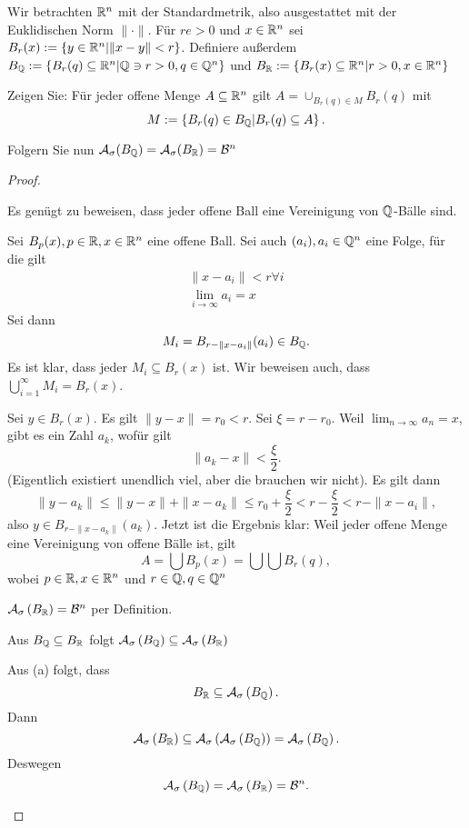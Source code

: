 \begin{Problem}
	Wir betrachten $\mathbb{R}^n$ mit der Standardmetrik, also ausgestattet mit der Euklidischen Norm $\|\cdot\|$. F\"{u}r $re>0$ und $x\in \mathbb{R}^n$ sei $B_r(x):=\left\{ y\in \mathbb{R}^n |\|x-y\|<r \right\} $. Definiere außerdem $B_{\mathbb{Q}} := \left\{ B_r(q)\subseteq \mathbb{R}^n | \mathbb{Q} \ni r > 0, q \in \mathbb{Q}^n \right\} $ und $B_{\mathbb{R}} :=\left\{ B_r(x)\subseteq \mathbb{R}^n | r > 0, x \in \mathbb{R}^n \right\} $ 
	\begin{parts}
	\item Zeigen Sie: F\"{u}r jeder offene Menge $A\subseteq \mathbb{R}^n$ gilt $A=\cup_{B_r(q)\in M}B_r(q)$ mit
		\[
		M:= \left\{ B_r(q)\in B_{\mathbb{Q}}| B_r(q)\subseteq A \right\} 
		.\]
	\item Folgern Sie nun $\mathcal A_\sigma (B_{\mathbb{Q}})=\mathcal A_\sigma(B_{\mathbb{R}})=\mathcal{B}^n$
	\end{parts}
\end{Problem}

\begin{proof}
\begin{parts}
\item Es genügt zu beweisen, dass jeder offene Ball eine Vereinigung von $\mathbb{Q}$-Bälle sind.

	Sei $B_p(x), p\in \mathbb{R}, x\in \mathbb{R}^n$ eine offene Ball. Sei auch $(a_i), a_i\in \mathbb{Q}^n$ eine Folge, für die gilt
\begin{gather*}
	\|x-a_i\|<r \forall i\\
	\lim_{i \to \infty} a_i=x
\end{gather*}
Sei dann
\[
	M_i=B_{r-\|x-a_i\|}(a_i)\in B_{\mathbb{Q}}
.\] 
Es ist klar, dass jeder $M_i\subseteq B_r(x)$ ist. Wir beweisen auch, dass $\bigcup_{i=1} ^\infty M_i=B_r(x)$.

Sei $y\in B_r(x)$. Es gilt $\|y-x\|=r_0<r$. Sei $\xi=r-r_0$. Weil $\lim_{n \to \infty} a_n=x$, gibt es ein Zahl $a_k$, wof\"{u}r gilt
\[
\|a_k-x\|<\frac{\xi}{2}
.\] 
(Eigentlich existiert unendlich viel, aber die brauchen wir nicht). Es gilt dann
\[
\|y-a_k\|\le \|y-x\|+\|x-a_k\|\le r_0+\frac{\xi}{2}<r-\frac{\xi}{2}<r-\|x-a_i\|
,\] 
also $y\in B_{r-\|x-a_k\|}(a_k)$. Jetzt ist die Ergebnis klar: Weil jeder offene Menge eine Vereinigung von offene B\"{a}lle ist, gilt
\[
A=\bigcup B_p(x)= \bigcup \bigcup B_r(q)
,\] 
wobei $ p\in \mathbb{R}, x\in \mathbb{R}^n$ und $r\in \mathbb{Q}, q\in \mathbb{Q}^n$

\item $\mathcal A_\sigma\left( B_{\mathbb{R}} \right) =\mathcal B^n$ per Definition. 

	Aus $B_{\mathbb{Q}}\subseteq B_{\mathbb{R}}$ folgt $\mathcal A_\sigma\left( B_{\mathbb{Q}} \right)  \subseteq \mathcal A_\sigma\left( B_{\mathbb{R}} \right) $

Aus (a) folgt, dass
\[
B_{\mathbb{R}}\subseteq \mathcal A_\sigma\left( B_{\mathbb{Q}} \right) 
.\] 
Dann
\[
\mathcal A_\sigma\left( B_{\mathbb{R}} \right) \subseteq \mathcal A_\sigma\left( \mathcal A_\sigma\left( B_{\mathbb{Q}} \right)  \right) =\mathcal A_\sigma\left( B_{\mathbb{Q}} \right) 
.\]
Deswegen
\[
	\mathcal A_\sigma\left( B_{\mathbb{Q}} \right) =\mathcal A_\sigma\left( B_{\mathbb{R}} \right) =\mathcal B^n
.\qedhere\] 
\end{parts}
\end{proof}


